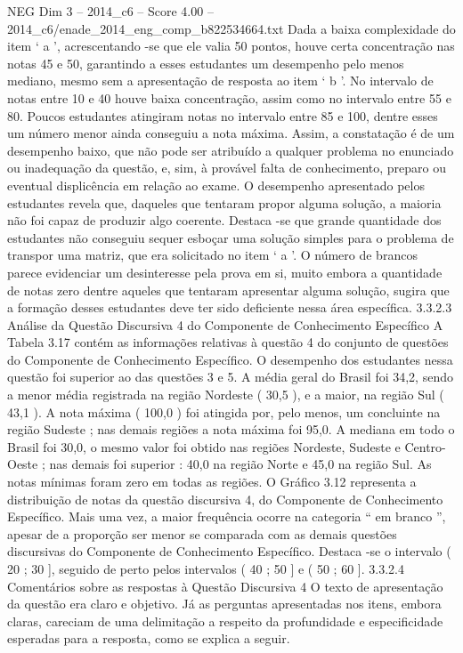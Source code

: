 \begin{textsample}{NEG Dim 3 – 2014\_c6 – Score 4.00 – 2014\_c6/enade\_2014\_eng\_comp\_b822534664.txt}
Dada a baixa complexidade do item ‘ a ’, acrescentando -se que ele valia 50 pontos, houve certa concentração nas notas 45 e 50, garantindo a esses estudantes um desempenho pelo menos mediano, mesmo sem a apresentação de resposta ao item ‘ b ’.
No intervalo de notas entre 10 e 40 houve baixa concentração, assim como no intervalo entre 55 e 80.
Poucos estudantes atingiram notas no intervalo entre 85 e 100, dentre esses um número menor ainda conseguiu a nota máxima.
Assim, a constatação é de um desempenho baixo, que não pode ser atribuído a qualquer problema no enunciado ou inadequação da questão, e, sim, à provável falta de conhecimento, preparo ou eventual displicência em relação ao exame.
O desempenho apresentado pelos estudantes revela que, daqueles que tentaram propor alguma solução, a maioria não foi capaz de produzir algo coerente.
Destaca -se que grande quantidade dos estudantes não conseguiu sequer esboçar uma solução simples para o problema de transpor uma matriz, que era solicitado no item ‘ a ’.
O número de brancos parece evidenciar um desinteresse pela prova em si, muito embora a quantidade de notas zero dentre aqueles que tentaram apresentar alguma solução, sugira que a formação desses estudantes deve ter sido deficiente nessa área específica. 3.3.2.3 Análise da Questão Discursiva 4 do Componente de Conhecimento Específico A Tabela 3.17 contém as informações relativas à questão 4 do conjunto de questões do Componente de Conhecimento Específico.
O desempenho dos estudantes nessa questão foi superior ao das questões 3 e 5.
A média geral do Brasil foi 34,2, sendo a menor média registrada na região Nordeste ( 30,5 ), e a maior, na região Sul ( 43,1 ).
A nota máxima ( 100,0 ) foi atingida por, pelo menos, um concluinte na região Sudeste ; nas demais regiões a nota máxima foi 95,0.
A mediana em todo o Brasil foi 30,0, o mesmo valor foi obtido nas regiões Nordeste, Sudeste e Centro-Oeste ; nas demais foi superior : 40,0 na região Norte e 45,0 na região Sul.
As notas mínimas foram zero em todas as regiões.
O Gráfico 3.12 representa a distribuição de notas da questão discursiva 4, do Componente de Conhecimento Específico.
Mais uma vez, a maior frequência ocorre na categoria “ em branco ”, apesar de a proporção ser menor se comparada com as demais questões discursivas do Componente de Conhecimento Específico.
Destaca -se o intervalo ( 20 ; 30 ], seguido de perto pelos intervalos ( 40 ; 50 ] e ( 50 ; 60 ]. 3.3.2.4 Comentários sobre as respostas à Questão Discursiva 4 O texto de apresentação da questão era claro e objetivo.
Já as perguntas apresentadas nos itens, embora claras, careciam de uma delimitação a respeito da profundidade e especificidade esperadas para a resposta, como se explica a seguir.

\end{textsample}
